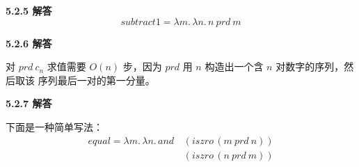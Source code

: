 \begin{taplauthorsolutionentrybox}
\label{sol:author:5.2.5}
\textbf{5.2.5 解答}
\[
  \mathit{subtract1}
  =\lambda m.\,\lambda n.\,n\ \mathit{prd}\ m
\]
\end{taplauthorsolutionentrybox}

\begin{taplauthorsolutionentrybox}
\label{sol:author:5.2.6}
\textbf{5.2.6 解答}

对 \(\mathit{prd}\ c_n\) 求值需要 \(O(n)\) 步，因为
\(\mathit{prd}\) 用 \(n\) 构造出一个含 \(n\) 对数字的序列，然后取该
序列最后一对的第一分量。

\end{taplauthorsolutionentrybox}

\begin{taplauthorsolutionentrybox}
\label{sol:author:5.2.7}
\textbf{5.2.7 解答}

下面是一种简单写法：
\[
\begin{aligned}
\mathit{equal}
  =\lambda m.\,\lambda n.\,
  \mathit{and}\,
  &(\mathit{iszro}\,(m\ \mathit{prd}\ n))\\
  &(\mathit{iszro}\,(n\ \mathit{prd}\ m))
\end{aligned}
\]

\end{taplauthorsolutionentrybox}

